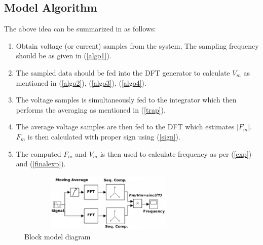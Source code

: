 \subsection{Model Algorithm}
The above idea can be summarized in as follows:
\begin{enumerate}
\item Obtain voltage (or current) samples from the system, The sampling frequency should be as given in (\ref{algo1}).
\item The sampled data should be fed into the DFT generator to calculate $V_m$ as mentioned in (\ref{algo2}), (\ref{algo3}), (\ref{algo4}).
\item The voltage samples is simultaneously fed to the integrator which then performs the averaging as mentioned in (\ref{trap}).
\item The average voltage samples are then fed to the DFT  which estimates $|F_m|$. $F_m$ is then calculated with proper sign using (\ref{sign}).
\item The computed $F_m$ and $V_m$ is then used to calculate frequency as per (\ref{exp}) and (\ref{finalexp}).
\end{enumerate}

\begin{figure}[!t]
\centering
\includegraphics[height=1.1in,width=3.45in]{blockdiag.eps}
\caption{Block model diagram}
\label{blockdiag}
\end{figure}

